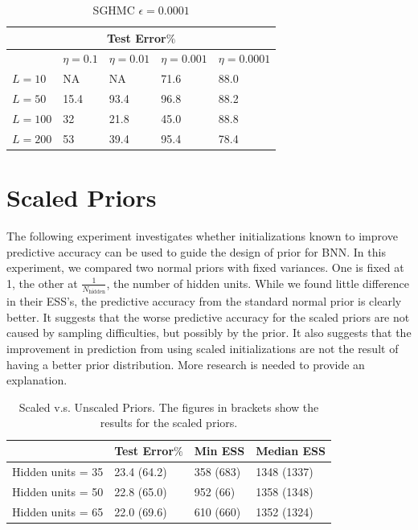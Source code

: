 \documentclass[12pt]{report}
\begin{document}
\begin{table}[]
\begin{minipage}{0.5\linewidth}
\begin{tabular}{@{}lllll@{}}
\toprule
\multicolumn{5}{c}{Test Error$\%$}                  \\ \midrule
     & $\eta = 0.1 $ & $\eta = 0.01$ & $\eta = 0.001$ & $\eta =0.0001$ \\ \midrule
$L=10$  & NA       & NA     & 71.6      & 88.0    \\ \midrule
$L=50$  & 15.4      & 93.4    & 96.8     & 88.2  \\ \midrule
$L =100 $& 32      & 21.8   & 45.0      & 88.8   \\ \midrule
$L=200 $ & 53      & 39.4     & 95.4      & 78.4   \\ \bottomrule
\end{tabular}
\caption{SGHMC $\epsilon = 0.0001$}
\end{minipage}
\end{table}


\section{Scaled Priors}
The following experiment investigates whether initializations known to improve predictive accuracy can be used to guide the design of prior for BNN. In this experiment, we compared two normal priors with fixed variances. One is fixed at 1, the other at $\frac{1}{N_{\text{hidden}}}$, the number of hidden units. While we found little difference in their ESS's, the predictive accuracy from the standard normal prior is clearly better. It suggests that the worse predictive accuracy for the scaled priors are not caused by sampling difficulties, but possibly by the prior. It also suggests that the improvement in prediction from using scaled initializations \cite{bengio1994learning} are not the result of having a better prior distribution. More research is needed to provide an explanation.

\begin{table}[]
\centering
\begin{tabular}{@{}llll@{}}
\toprule
            & Test Error$\%$ & Min ESS & Median ESS \\ \midrule
Hidden units = 35 & 23.4 (64.2)        & 358 (683)     & 1348 (1337)       \\ \midrule
Hidden units = 50 & 22.8 (65.0)        & 952 (66)      & 1358 (1348)         \\ \midrule
Hidden units = 65 & 22.0 (69.6)      & 610 (660)      & 1352 (1324)        \\ \bottomrule
\end{tabular}
\caption{Scaled v.s. Unscaled Priors. The figures in brackets show the results for the scaled priors.}

\end{table}
\end{document}
